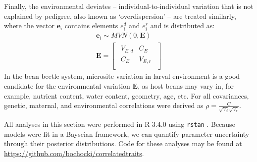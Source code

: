 \documentclass[11pt]{article}
\def\code#1{\texttt{#1}}
\begin{document}
Finally, the environmental deviates -- individual-to-individual variation that is not explained by pedigree, also known as `overdispersion' \citep{de2016general} -- are treated similarly, where the vector $\bm{e}_{i}$ contains elements $e^{d}_{i}$ and $e^{r}_{i}$ and is distributed as:
%
\begin{gather} \label{corr:env}
  \bm{e}_{i} \sim \mathit{MVN} (0, \bm{E}) \\[5pt]
  \bm{E} =
  \begin{bmatrix}
    \begin{array}{ll}
      V_{E,d} &C_{E}   \\
      C_{E}   &V_{E,r} \\
    \end{array}
  \end{bmatrix}
\end{gather}
%
In the bean beetle system, microsite variation in larval environment is a good candidate for the environmental variation $\bm{E}$, as host beans may vary in, for example, nutrient content, water content, geometry, age, etc.
For all covariances, genetic, maternal, and environmental correlations were derived as $\rho = \frac{C}{\sqrt{V_{d}}\sqrt{V_{r}}}$.

%
%
All analyses in this section were performed in R 3.4.0 \citep{r_core_team_r:_2015} using \code{rstan} \citep{stan_development_team_rstan:_2015}.
Because models were fit in a Bayseian framework, we can quantify parameter uncertainty through their posterior distributions.
Code for these analyses may be found at \url{https://github.com/bochocki/correlatedtraits}.
\end{document}
